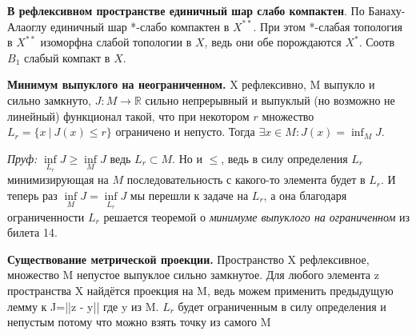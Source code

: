 \documentclass[10pt,a4paper]{article}
\newcommand{\X}{X}
\newcommand{\R}{\mathbb R}
\begin{document}
	\textbf{В рефлексивном пространстве единичный шар слабо компактен}. По Банаху-Алаоглу единичный шар *-слабо компактен в $X^{**}$. При этом *-слабая топология в $X^{**}$ изоморфна слабой топологии в $X$, ведь они обе порождаются $X^*$. Соотв $B_1$ слабый компакт в $X$.

	\textbf{Минимум выпуклого на неограниченном.}
	X рефлексивно, M выпукло и сильно замкнуто, $J: M \to \R$ сильно непрерывный и выпуклый (но возможно не линейный) функционал такой, что при некотором $r$ множество $L_r = \{x\ |\ J(x) \leq r\}$ ограничено и непусто. Тогда $\exists x \in M: J(x) = \inf_M J$.

	\textit{Пруф:} $\inf\limits_{L_r} J \geq \inf\limits_M J$ ведь $L_r \subset M$. Но и $\leq$, ведь в силу определения $L_r$ минимизирующая на $M$ последовательность с какого-то элемента будет в $L_r$. И теперь раз $\inf\limits_M J = \inf\limits_{L_r} J$ мы перешли к задаче на $L_r$, а она благодаря ограниченности $L_r$ решается теоремой о \textit{минимуме выпуклого на ограниченном} из билета 14.

	\textbf{Существование метрической проекции.}
	Пространство X рефлексивное, множество M непустое выпуклое сильно замкнутое. Для любого элемента z пространства X найдётся проекция на M, ведь можем применить предыдущую лемму к J=||z - y|| где y из M. $L_r$ будет ограниченным в силу определения и непустым потому что можно взять точку из самого M





\end{document}

